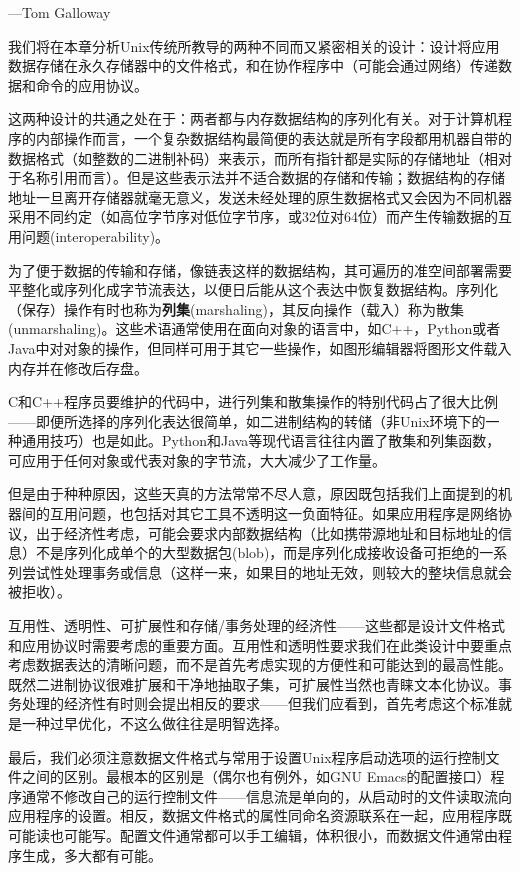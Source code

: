 \documentclass[12pt,oneside]{ctexbook}
\begin{document}
\begin{common-format}
\begin{flushright}
\begin{notecard}{27em}
{\hfill —Tom Galloway}
\end{notecard}
\end{flushright}


我们将在本章分析Unix传统所教导的两种不同而又紧密相关的设计：设计将应用数据存储在永久存储器中的文件格式，和在协作程序中（可能会通过网络）传递数据和命令的应用协议。

这两种设计的共通之处在于：两者都与内存数据结构的序列化有关。对于计算机程序的内部操作而言，一个复杂数据结构最简便的表达就是所有字段都用机器自带的数据格式（如整数的二进制补码）来表示，而所有指针都是实际的存储地址（相对于名称引用而言）。但是这些表示法并不适合数据的存储和传输；数据结构的存储地址一旦离开存储器就毫无意义，发送未经处理的原生数据格式又会因为不同机器采用不同约定（如高位字节序对低位字节序，或32位对64位）而产生传输数据的互用问题(interoperability)。

为了便于数据的传输和存储，像链表这样的数据结构，其可遍历的准空间部署需要平整化或序列化成字节流表达，以便日后能从这个表达中恢复数据结构。序列化（保存）操作有时也称为\textbf{列集}(marshaling)，其反向操作（载入）称为散集(unmarshaling)。这些术语通常使用在面向对象的语言中，如C++，Python或者Java中对对象的操作，但同样可用于其它一些操作，如图形编辑器将图形文件载入内存并在修改后存盘。

C和C++程序员要维护的代码中，进行列集和散集操作的特别代码占了很大比例——即便所选择的序列化表达很简单，如二进制结构的转储（非Unix环境下的一种通用技巧）也是如此。Python和Java等现代语言往往内置了散集和列集函数，可应用于任何对象或代表对象的字节流，大大减少了工作量。

但是由于种种原因，这些天真的方法常常不尽人意，原因既包括我们上面提到的机器间的互用问题，也包括对其它工具不透明这一负面特征。如果应用程序是网络协议，出于经济性考虑，可能会要求内部数据结构（比如携带源地址和目标地址的信息）不是序列化成单个的大型数据包(blob)，而是序列化成接收设备可拒绝的一系列尝试性处理事务或信息（这样一来，如果目的地址无效，则较大的整块信息就会被拒收）。

互用性、透明性、可扩展性和存储/事务处理的经济性——这些都是设计文件格式和应用协议时需要考虑的重要方面。互用性和透明性要求我们在此类设计中要重点考虑数据表达的清晰问题，而不是首先考虑实现的方便性和可能达到的最高性能。既然二进制协议很难扩展和干净地抽取子集，可扩展性当然也青睐文本化协议。事务处理的经济性有时则会提出相反的要求——但我们应看到，首先考虑这个标准就是一种过早优化，不这么做往往是明智选择。

最后，我们必须注意数据文件格式与常用于设置Unix程序启动选项的运行控制文件之间的区别。最根本的区别是（偶尔也有例外，如GNU Emacs的配置接口）程序通常不修改自己的运行控制文件——信息流是单向的，从启动时的文件读取流向应用程序的设置。相反，数据文件格式的属性同命名资源联系在一起，应用程序既可能读也可能写。配置文件通常都可以手工编辑，体积很小，而数据文件通常由程序生成，多大都有可能。


\end{common-format}
\end{document}
